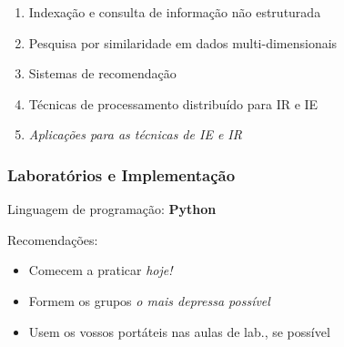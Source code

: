 \documentclass{beamer}
\begin{document}
\begin{frame}
\begin{enumerate}
	\item Indexação e consulta de informação não estruturada
	\item Pesquisa por similaridade em dados multi-dimensionais 
	\item Sistemas de recomendação 
	\item Técnicas de processamento distribuído para IR e IE 
	\item {\it Aplicações para as técnicas de IE e IR}
	\end{enumerate}
\end{frame}

\begin{frame}
    \frametitle{Laboratórios e Implementação}
    \begin{center}
        Linguagem de programação: \textbf{Python} \\[.5\baselineskip]
    \end{center}
    \begin{block}{Recomendações:}
        \begin{itemize}
        \item Comecem a praticar \emph{hoje!}
        \item Formem os grupos \emph{o mais depressa possível}
        \item Usem os vossos portáteis nas aulas de lab., se possível
        \end{itemize}
    \end{block}
\end{frame}
\end{document}
